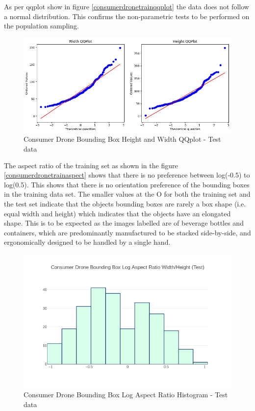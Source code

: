 \documentclass{article}
\begin{document}
As per qqplot show in figure \ref{consumerdronetrainqqplot} the data does not follow a normal distribution. This confirms the non-parametric tests to be performed on the population sampling.

\begin{figure}[h]
\centering
\label{consumerdronetestqqplot}
\includegraphics[scale=0.4]{images/test-qqplot.png}
\caption{Consumer Drone Bounding Box Height and Width QQplot - Test data}
\end{figure}

The aspect ratio of the training set as shown in the figure \ref{consumerdronetrainaspect} shows that there is no preference between log(-0.5) to log(0.5). This shows that there is no orientation preference of the bounding boxes in the training data set. The smaller values at the O for both the training set and the test set indicate that the objects bounding boxes are rarely a box shape (i.e. equal width and height) which indicates that the objects have an elongated shape. This is to be expected as the images labelled are of beverage bottles and containers, which are predominantly manufactured to be stacked side-by-side, and ergonomically designed to be handled by a single hand.

\begin{figure}[H]
\centering
\label{consumerdronetestaspect}
\includegraphics[scale=0.4]{images/test-aspect.png}
\caption{Consumer Drone Bounding Box Log Aspect Ratio Histogram - Test data}
\end{figure}
\end{document}
